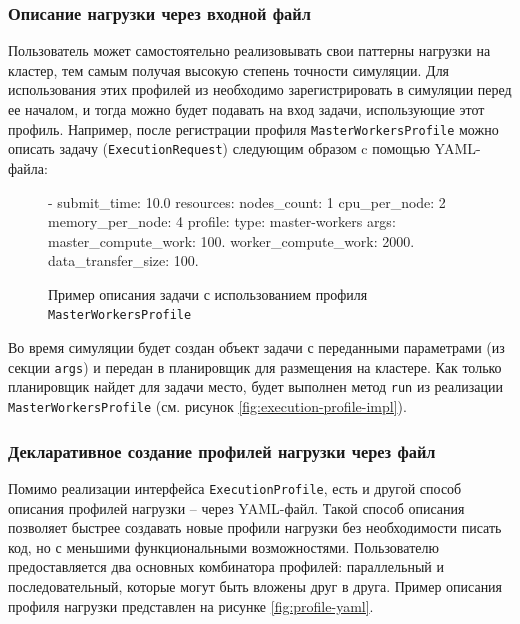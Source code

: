 \subsubsection{Описание нагрузки через входной файл}

Пользователь может самостоятельно реализовывать свои паттерны нагрузки на кластер, тем самым получая высокую степень точности симуляции. Для использования этих профилей из необходимо зарегистрировать в симуляции перед ее началом, и тогда можно будет подавать на вход задачи, использующие этот профиль. Например, после регистрации профиля \texttt{MasterWorkersProfile} можно описать задачу (\texttt{ExecutionRequest}) следующим образом c помощью YAML-файла: 

\begin{figure}[h!]
    \footnotesize
    \begin{yamlcode}
                    - submit_time: 10.0
                      resources:
                        nodes_count: 1
                        cpu_per_node: 2
                        memory_per_node: 4
                      profile:
                        type: master-workers
                        args:
                          master_compute_work: 100. 
                          worker_compute_work: 2000. 
                          data_transfer_size: 100.
\end{yamlcode}
    \caption{Пример описания задачи с использованием профиля \texttt{MasterWorkersProfile}}
\end{figure}

Во время симуляции будет создан объект задачи с переданными параметрами (из секции \texttt{args}) и передан в планировщик для размещения на кластере. Как только планировщик найдет для задачи место, будет выполнен метод \texttt{run} из реализации \texttt{MasterWorkersProfile} (см. рисунок \ref{fig:execution-profile-impl}). 

\subsubsection{Декларативное создание профилей нагрузки через файл}

Помимо реализации интерфейса \texttt{ExecutionProfile}, есть и другой способ описания профилей нагрузки -- через YAML-файл. Такой способ описания позволяет быстрее создавать новые профили нагрузки без необходимости писать код, но с меньшими функциональными возможностями. Пользователю предоставляется два основных комбинатора профилей: параллельный и последовательный, которые могут быть вложены друг в друга. Пример описания профиля нагрузки представлен на рисунке \ref{fig:profile-yaml}.

